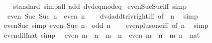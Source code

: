 \begin{isabellebody}
%
\isadelimproof
\ \ %
\endisadelimproof
%
\isatagproof
{}\isamarkupfalse%
\ standard\ {\isacharparenleft}{\kern0pt}simp{\isacharunderscore}{\kern0pt}all\ add{\isacharcolon}{\kern0pt}\ dvd{\isacharunderscore}{\kern0pt}eq{\isacharunderscore}{\kern0pt}mod{\isacharunderscore}{\kern0pt}eq{\isacharunderscore}{\kern0pt}{}{\isacharparenright}{\kern0pt}%
\endisatagproof
{\isafoldproof}%
%
\isadelimproof
\isanewline
%
\endisadelimproof
\isanewline
{}\isamarkupfalse%
\ even{\isacharunderscore}{\kern0pt}Suc{\isacharunderscore}{\kern0pt}Suc{\isacharunderscore}{\kern0pt}iff\ {\isacharbrackleft}{\kern0pt}simp{\isacharbrackright}{\kern0pt}{\isacharcolon}{\kern0pt}\isanewline
\ \ {\isachardoublequoteopen}even\ {\isacharparenleft}{\kern0pt}Suc\ {\isacharparenleft}{\kern0pt}Suc\ n{\isacharparenright}{\kern0pt}{\isacharparenright}{\kern0pt}\ {\isasymlongleftrightarrow}\ even\ n{\isachardoublequoteclose}\isanewline
%
\isadelimproof
\ \ %
\endisadelimproof
%
\isatagproof
{}\isamarkupfalse%
\ dvd{\isacharunderscore}{\kern0pt}add{\isacharunderscore}{\kern0pt}triv{\isacharunderscore}{\kern0pt}right{\isacharunderscore}{\kern0pt}iff\ {\isacharbrackleft}{\kern0pt}of\ {}\ n{\isacharbrackright}{\kern0pt}\ \isamarkupfalse%
\ simp%
\endisatagproof
{\isafoldproof}%
%
\isadelimproof
\isanewline
%
\endisadelimproof
\isanewline
{}\isamarkupfalse%
\ even{\isacharunderscore}{\kern0pt}Suc\ {\isacharbrackleft}{\kern0pt}simp{\isacharbrackright}{\kern0pt}{\isacharcolon}{\kern0pt}\ {\isachardoublequoteopen}even\ {\isacharparenleft}{\kern0pt}Suc\ n{\isacharparenright}{\kern0pt}\ {\isasymlongleftrightarrow}\ odd\ n{\isachardoublequoteclose}\isanewline
%
\isadelimproof
\ \ %
\endisadelimproof
%
\isatagproof
{}\isamarkupfalse%
\ even{\isacharunderscore}{\kern0pt}plus{\isacharunderscore}{\kern0pt}one{\isacharunderscore}{\kern0pt}iff\ {\isacharbrackleft}{\kern0pt}of\ n{\isacharbrackright}{\kern0pt}\ \isamarkupfalse%
\ simp%
\endisatagproof
{\isafoldproof}%
%
\isadelimproof
\isanewline
%
\endisadelimproof
\isanewline
{}\isamarkupfalse%
\ even{\isacharunderscore}{\kern0pt}diff{\isacharunderscore}{\kern0pt}nat\ {\isacharbrackleft}{\kern0pt}simp{\isacharbrackright}{\kern0pt}{\isacharcolon}{\kern0pt}\isanewline
\ \ {\isachardoublequoteopen}even\ {\isacharparenleft}{\kern0pt}m\ {\isacharminus}{\kern0pt}\ n{\isacharparenright}{\kern0pt}\ {\isasymlongleftrightarrow}\ m\ {\isacharless}{\kern0pt}\ n\ {\isasymor}\ even\ {\isacharparenleft}{\kern0pt}m\ {\isacharplus}{\kern0pt}\ n{\isacharparenright}{\kern0pt}{\isachardoublequoteclose}\ \ m\ n\ {\isacharcolon}{\kern0pt}{\isacharcolon}{\kern0pt}\ nat\isanewline

\end{isabellebody}
